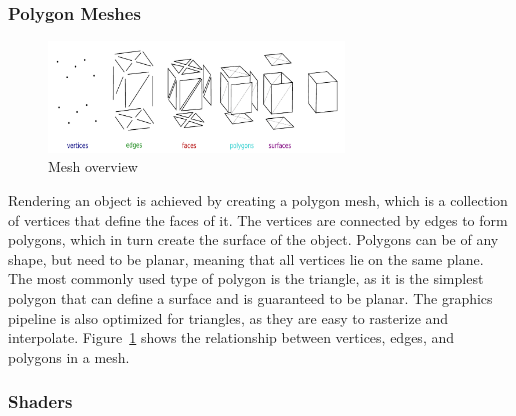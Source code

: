 \subsubsection{Polygon Meshes}

\begin{figure}[h]
    \centering
    \includegraphics[width=0.70\textwidth]{images/Mesh_overview}
    \caption{Mesh overview}
    \label{fig:mesh-overview}
\end{figure}

Rendering an object is achieved by creating a polygon mesh, which is a collection of vertices that define the faces of it.
The vertices are connected by edges to form polygons, which in turn create the surface of the object.
Polygons can be of any shape, but need to be planar, meaning that all vertices lie on the same plane.
The most commonly used type of polygon is the triangle, as it is the simplest polygon that can define a surface and is guaranteed to be planar.
The graphics pipeline is also optimized for triangles, as they are easy to rasterize and interpolate.
Figure~\ref{fig:mesh-overview} shows the relationship between vertices, edges, and polygons in a mesh. \cite{dorner_virtual_2019}


%



\subsubsection{Shaders}\label{subsec:shaders}

